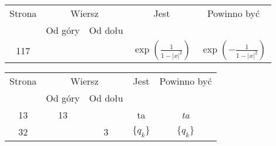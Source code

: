 \documentclass[a4paper,11pt]{article}
\begin{document}
\begin{center}

  \begin{tabular}{|c|c|c|c|c|}
    \hline
    Strona & \multicolumn{2}{c|}{Wiersz} & Jest
                              & Powinno być \\ \cline{2-3}
    & Od góry & Od dołu & & \\
    \hline
    117 & & & $\exp\left( \frac{ 1 }{ 1 - | x |^{ 2 } } \right)$
           & $\exp\left( -\frac{ 1 }{ 1 - | x |^{ 2 } } \right)$ \\
    \hline
  \end{tabular}

\end{center}

\vspace{\spaceTwo}
















\newpage





\begin{center}

  \begin{tabular}{|c|c|c|c|c|}
    \hline
    Strona & \multicolumn{2}{c|}{Wiersz} & Jest
                              & Powinno być \\ \cline{2-3}
    & Od góry & Od dołu & & \\
    \hline
    13  & 13 & & ta & \emph{ta} \\
    32  & &  3 & $\boldsymbol{ \{ } q_{ k } \}$ & $\{ q_{ k } \}$ \\
    \hline
  \end{tabular}

\end{center}
\end{document}
